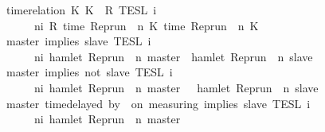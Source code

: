 \begin{isabellebody}
{\isacharbar}\ {\isacartoucheopen}{\isasymlbrakk}\ time{\isacharminus}relation\ {\isasymlfloor}K\ K\ {\isasymin}\ R\ {\isasymrbrakk}\isactrlsub T\isactrlsub E\isactrlsub S\isactrlsub L\isactrlbsup {\isasymge}\ i\isactrlesup \ {\isacharequal}\isanewline
\ \ \ \ \ \ {\isacharbraceleft}{\isasymrho}{\isachardot}\ {\isasymforall}n{\isasymge}i{\isachardot}\ R\ {\isacharparenleft}time\ {\isacharparenleft}{\isacharparenleft}Rep{\isacharunderscore}run\ {\isasymrho}{\isacharparenright}\ n\ K\ time\ {\isacharparenleft}{\isacharparenleft}Rep{\isacharunderscore}run\ {\isasymrho}{\isacharparenright}\ n\ K\isanewline
{\isacharbar}\ {\isacartoucheopen}{\isasymlbrakk}\ master\ implies\ slave\ {\isasymrbrakk}\isactrlsub T\isactrlsub E\isactrlsub S\isactrlsub L\isactrlbsup {\isasymge}\ i\isactrlesup \ {\isacharequal}\isanewline
\ \ \ \ \ \ {\isacharbraceleft}{\isasymrho}{\isachardot}\ {\isasymforall}n{\isasymge}i{\isachardot}\ hamlet\ {\isacharparenleft}{\isacharparenleft}Rep{\isacharunderscore}run\ {\isasymrho}{\isacharparenright}\ n\ master{\isacharparenright}\ {\isasymlongrightarrow}\ hamlet\ {\isacharparenleft}{\isacharparenleft}Rep{\isacharunderscore}run\ {\isasymrho}{\isacharparenright}\ n\ slave{\isacharparenright}{\isacharbraceright}{\isacartoucheclose}\isanewline
{\isacharbar}\ {\isacartoucheopen}{\isasymlbrakk}\ master\ implies\ not\ slave\ {\isasymrbrakk}\isactrlsub T\isactrlsub E\isactrlsub S\isactrlsub L\isactrlbsup {\isasymge}\ i\isactrlesup \ {\isacharequal}\isanewline
\ \ \ \ \ \ {\isacharbraceleft}{\isasymrho}{\isachardot}\ {\isasymforall}n{\isasymge}i{\isachardot}\ hamlet\ {\isacharparenleft}{\isacharparenleft}Rep{\isacharunderscore}run\ {\isasymrho}{\isacharparenright}\ n\ master{\isacharparenright}\ {\isasymlongrightarrow}\ {\isasymnot}\ hamlet\ {\isacharparenleft}{\isacharparenleft}Rep{\isacharunderscore}run\ {\isasymrho}{\isacharparenright}\ n\ slave{\isacharparenright}{\isacharbraceright}{\isacartoucheclose}\isanewline
{\isacharbar}\ {\isacartoucheopen}{\isasymlbrakk}\ master\ time{\isacharminus}delayed\ by\ {\isasymdelta}{\isasymtau}\ on\ measuring\ implies\ slave\ {\isasymrbrakk}\isactrlsub T\isactrlsub E\isactrlsub S\isactrlsub L\isactrlbsup {\isasymge}\ i\isactrlesup \ {\isacharequal}\isanewline
\ \ \ \ \ \ {\isacharbraceleft}{\isasymrho}{\isachardot}\ {\isasymforall}n{\isasymge}i{\isachardot}\ hamlet\ {\isacharparenleft}{\isacharparenleft}Rep{\isacharunderscore}run\ {\isasymrho}{\isacharparenright}\ n\ master{\isacharparenright}\ {\isasymlongrightarrow}\isanewline

\end{isabellebody}
